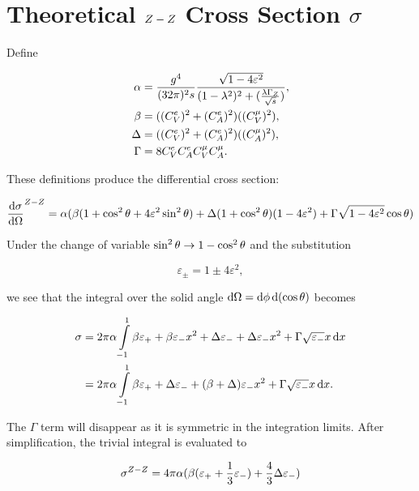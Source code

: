 \documentclass[]{report}
\begin{document}
\section{Theoretical $Z -Z $ Cross Section $\sigma$}

Define

\begin{align*}
\alpha &= \frac{g^{4}}{(32\pi)^{2}s} \frac{\sqrt{1-4\varepsilon^{2}}}{(1-\lambda^{2})^{2} + (\frac{\lambda\Gamma_{\Zzero}}{\rts})},
\\
\beta &= ((C_{V}^{e})^{2} + (C_{A}^{e})^{2})((C_{V}^{\mu})^{2}),
\\
\Delta &= ((C_{V}^{e})^{2} + (C_{A}^{e})^{2})((C_{A}^{\mu})^{2}),
\\
\Gamma &= 8C_{V}^{e}C_{A}^{e}C_{V}^{\mu}C_{A}^{\mu}.
\end	{align*}

These definitions produce the differential cross section:

$$
\frac{\operatorname{d}\!{\sigma}}{\operatorname{d}\!{\Omega}}^{Z -Z }
  = \alpha(\beta(1+\cos^{2}{\theta}+4\varepsilon^{2}\sin^{2}{\theta})
    + \Delta(1+\cos^{2}{\theta})(1-4\varepsilon^{2})
    + \Gamma\sqrt{1-4\varepsilon^{2}}\cos{\theta}
  )
$$

Under the change of variable $\sin^{2}{\theta}\rightarrow1-\cos^{2}{\theta}$ and the substitution

$$\varepsilon_{\pm}=1\pm4\varepsilon^{2},$$

we see that the integral over the solid angle $\operatorname{d}\!{\Omega} = \operatorname{d}\!{\phi}\operatorname{d}\!{(\cos{\theta})}$ becomes

\begin{align*}
\sigma &= 2\pi\alpha\int\limits_{-1}^{1}
  \beta\varepsilon_{+} + \beta\varepsilon_{-}x^{2} + \Delta\varepsilon_{-}
  + \Delta\varepsilon_{-}x^{2} + \Gamma\sqrt{\varepsilon_{-}}x
  \d{x}
  \\
  &= 2\pi\alpha\int\limits_{-1}^{1}
    \beta\varepsilon_{+} + \Delta\varepsilon_{-} + (\beta + \Delta)\varepsilon_{-}x^{2}
    + \Gamma\sqrt{\varepsilon_{-}}x
    \d{x}.
\end{align*}

The $\Gamma$ term will disappear as it is symmetric in the integration limits. After simplification, the trivial integral is evaluated to

$$
\sigma^{\Zzero-\Zzero} = 4\pi\alpha(\beta(\varepsilon_{+} + \frac{1}{3}\varepsilon_{-})
  + \frac{4}{3}\Delta\varepsilon_{-})
$$
\end{document}

